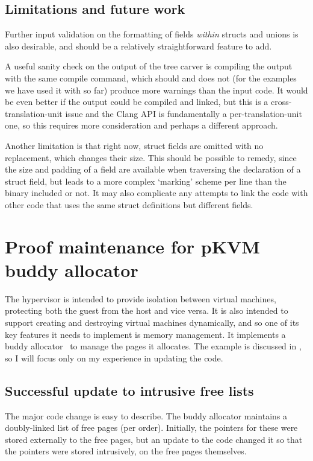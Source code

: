 \section{Limitations and future work}

Further input validation on the formatting of fields \emph{within} structs and
unions is also desirable, and should be a relatively straightforward feature to
add.

A useful sanity check on the output of the tree carver is compiling the output
with the same compile command, which should and does not (for the examples we
have used it with so far) produce more warnings than the input code. It would
be even better if the output could be compiled and linked, but this is a
cross-translation-unit issue and the Clang API is fundamentally a
per-translation-unit one, so this requires more consideration and perhaps a
different approach.

Another limitation is that right now, struct fields are omitted with no
replacement, which changes their size. This should be possible to remedy, since
the size and padding of a field are available when traversing the declaration
of a struct field, but leads to a more complex `marking' scheme per line than
the binary included or not. It may also complicate any attempts to link the
code with other code that uses the same struct definitions but different
fields.

\chapter{Proof maintenance for pKVM buddy allocator}\label{chap:buddy}

\margintoc{}

The  hypervisor is intended to provide isolation between virtual
machines, protecting both the guest from the host and vice versa. It is also
intended to support creating and destroying virtual machines dynamically, and
so one of its key features it needs to implement is memory management. It
implements a buddy allocator~ to manage the pages it
allocates. The example is discussed in , so I will
focus only on my experience in updating the code.

\section{Successful update to intrusive free lists}

The major code change is easy to describe. The buddy allocator maintains a
doubly-linked list of free pages (per order). Initially, the pointers for these
were stored externally to the free pages, but an update to the code changed it
so that the pointers were stored intrusively, on the free pages themselves.

